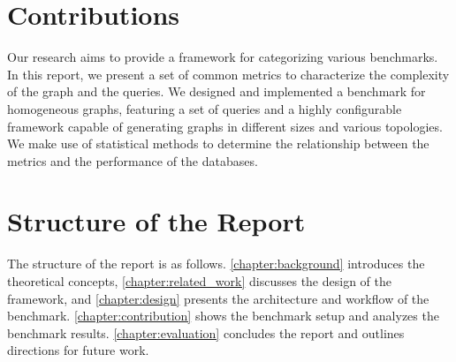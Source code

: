 \section{Contributions}
Our research aims to provide a framework for categorizing various benchmarks. In this report, we present a set of common metrics to characterize the complexity of the graph and the queries. We designed and implemented a benchmark for homogeneous graphs, featuring a set of queries and a highly configurable framework capable of generating graphs in different sizes and various topologies. We make use of statistical methods to determine the relationship between the metrics and the performance of the databases.

\section{Structure of the Report}

The structure of the report is as follows. \autoref{chapter:background} introduces the theoretical concepts, \autoref{chapter:related_work} discusses the design of the framework, and \autoref{chapter:design} presents the architecture and workflow of the benchmark. \autoref{chapter:contribution} shows the benchmark setup and analyzes the benchmark results. \autoref{chapter:evaluation} concludes the report and outlines directions for future work.


